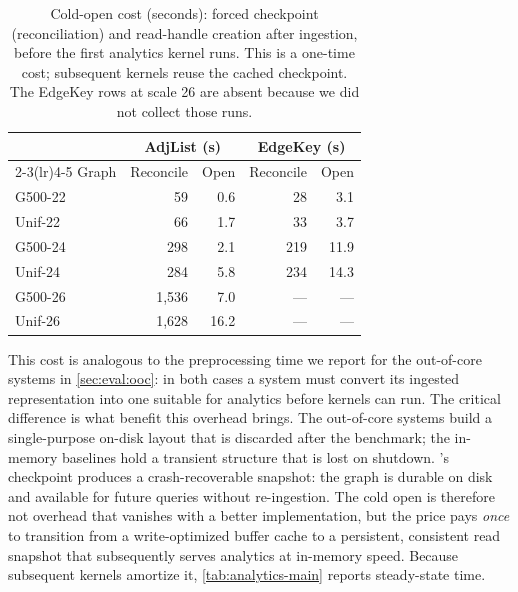 \begin{table}[t]
  \centering
  \setlength{\tabcolsep}{5pt}\renewcommand{\arraystretch}{1.05}
  \small
  \begin{tabular}{l rr rr}
  \toprule
   & \multicolumn{2}{c}{AdjList (s)} & \multicolumn{2}{c}{EdgeKey (s)} \\
  \cmidrule(lr){2-3}\cmidrule(lr){4-5}
  Graph & Reconcile & Open & Reconcile & Open \\
  \midrule
  G500-22 & 59 & 0.6 & 28 & 3.1 \\
  Unif-22 & 66 & 1.7 & 33 & 3.7 \\
  G500-24 & 298 & 2.1 & 219 & 11.9 \\
  Unif-24 & 284 & 5.8 & 234 & 14.3 \\
  G500-26 & 1{,}536 & 7.0 & --- & --- \\
  Unif-26 & 1{,}628 & 16.2 & --- & --- \\
  \bottomrule
  \end{tabular}
  \caption{Cold-open cost (seconds): forced checkpoint (reconciliation) and read-handle creation after ingestion, before the first analytics kernel runs.
  This is a one-time cost; subsequent kernels reuse the cached checkpoint.
  The EdgeKey rows at scale 26 are absent because we did not collect those runs.}
  \label{tab:cold-open}
\end{table}

This cost is analogous to the preprocessing time we report for the out-of-core systems in \autoref{sec:eval:ooc}: in both cases a system must convert its ingested representation into one suitable for analytics before kernels can run.
The critical difference is what benefit this overhead brings.
The out-of-core systems build a single-purpose on-disk layout that is discarded after the benchmark; the in-memory baselines hold a transient structure that is lost on shutdown.
\project{}'s checkpoint produces a crash-recoverable snapshot: the graph is durable on disk and available for future queries without re-ingestion.
The cold open is therefore not overhead that vanishes with a better implementation, but the price \project{} pays \emph{once} to transition from a write-optimized buffer cache to a persistent, consistent read snapshot that subsequently serves analytics at in-memory speed.
Because subsequent kernels amortize it, \autoref{tab:analytics-main} reports steady-state time.

